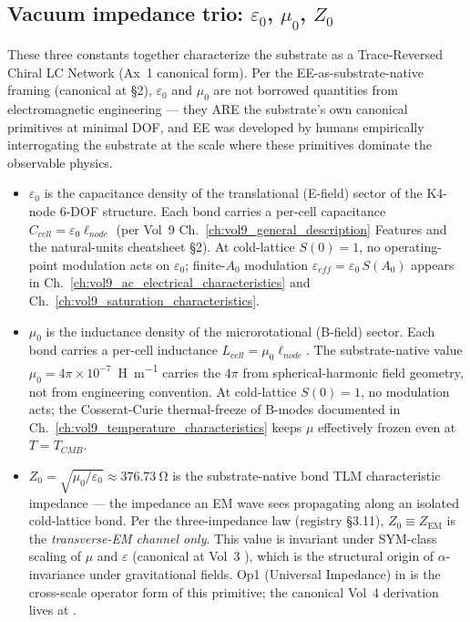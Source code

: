 \subsection{Vacuum impedance trio: $\varepsilon_0$, $\mu_0$, $Z_0$}
\label{subsec:vol9_dc_impedance_trio}

These three constants together characterize the substrate as a Trace-Reversed Chiral LC Network (Ax~1 canonical form). Per the EE-as-substrate-native framing (canonical at  \S 2), $\varepsilon_0$ and $\mu_0$ are not borrowed quantities from electromagnetic engineering --- they ARE the substrate's own canonical primitives at minimal DOF, and EE was developed by humans empirically interrogating the substrate at the scale where these primitives dominate the observable physics.

\begin{itemize}
    \item $\varepsilon_0$ is the capacitance density of the translational (E-field) sector of the K4-node 6-DOF structure. Each bond carries a per-cell capacitance $C_{cell} = \varepsilon_0 \ell_{node}$ (per Vol~9 Ch.~\ref{ch:vol9_general_description} Features and the natural-units cheatsheet \S 2). At cold-lattice $S(0) = 1$, no operating-point modulation acts on $\varepsilon_0$; finite-$A_0$ modulation $\varepsilon_{eff} = \varepsilon_0\,S(A_0)$ appears in Ch.~\ref{ch:vol9_ac_electrical_characteristics} and Ch.~\ref{ch:vol9_saturation_characteristics}.
    \item $\mu_0$ is the inductance density of the microrotational (B-field) sector. Each bond carries a per-cell inductance $L_{cell} = \mu_0 \ell_{node}$. The substrate-native value $\mu_0 = 4\pi \times 10^{-7}$~\si{\henry\per\metre} carries the $4\pi$ from spherical-harmonic field geometry, not from engineering convention. At cold-lattice $S(0) = 1$, no modulation acts; the Cosserat-Curie thermal-freeze of B-modes documented in Ch.~\ref{ch:vol9_temperature_characteristics} keeps $\mu$ effectively frozen even at $T = T_{CMB}$.
    \item $Z_0 = \sqrt{\mu_0/\varepsilon_0} \approx \qty{376.73}{\ohm}$ is the substrate-native bond TLM characteristic impedance --- the impedance an EM wave sees propagating along an isolated cold-lattice bond. Per the three-impedance law (registry \S3.11), $Z_0 \equiv Z_{\mathrm{EM}}$ is the \emph{transverse-EM channel only}. This value is invariant under SYM-class scaling of $\mu$ and $\varepsilon$ (canonical at Vol~3 ), which is the structural origin of $\alpha$-invariance under gravitational fields. Op1 (Universal Impedance) in  is the cross-scale operator form of this primitive; the canonical Vol~4 derivation lives at .
\end{itemize}

